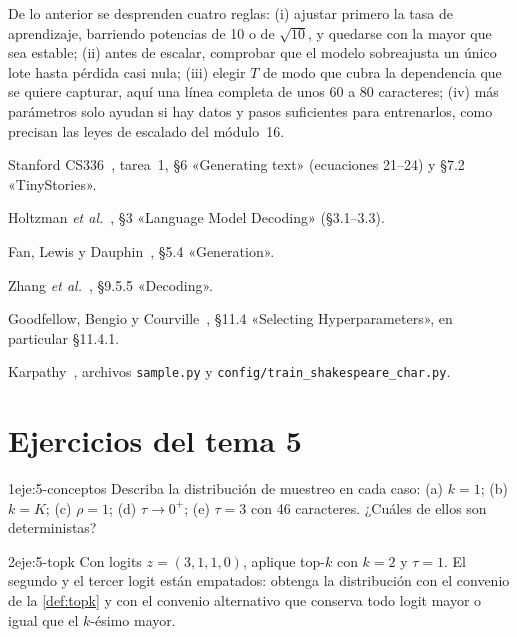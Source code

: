 \begin{observacion}\label{obs:reglas}
De lo anterior se desprenden cuatro reglas: (i) ajustar primero la tasa de aprendizaje, barriendo potencias de 10 o de $\sqrt{10}$, y quedarse con la mayor que sea estable; (ii) antes de escalar, comprobar que el modelo sobreajusta un único lote hasta pérdida casi nula; (iii) elegir $T$ de modo que cubra la dependencia que se quiere capturar, aquí una línea completa de unos 60 a 80 caracteres; (iv) más parámetros solo ayudan si hay datos y pasos suficientes para entrenarlos, como precisan las leyes de escalado del módulo~16.
\end{observacion}

\begin{lecturas}
\item Stanford CS336~\cite{cs336}, tarea~1, §6 «Generating text» (ecuaciones 21--24) y §7.2 «TinyStories».
\item Holtzman \emph{et al.}~\cite{holtzman}, §3 «Language Model Decoding» (§3.1--3.3).
\item Fan, Lewis y Dauphin~\cite{fan}, §5.4 «Generation».
\item Zhang \emph{et al.}~\cite{d2l}, §9.5.5 «Decoding».
\item Goodfellow, Bengio y Courville~\cite{gbc}, §11.4 «Selecting Hyperparameters», en particular §11.4.1.
\item Karpathy~\cite{nanogpt}, archivos \texttt{sample.py} y \texttt{config/train\_shakespeare\_char.py}.
\end{lecturas}

\section*{Ejercicios del tema 5}

\begin{ejercicio}{1}{eje:5-conceptos}
Describa la distribución de muestreo en cada caso: (a) $k=1$; (b) $k=K$; (c) $\rho=1$; (d) $\tau\to 0^{+}$; (e) $\tau=3$ con 46 caracteres. ¿Cuáles de ellos son deterministas?
\end{ejercicio}

\begin{ejercicio}{2}{eje:5-topk}
Con logits $z=(3,1,1,0)$, aplique top-$k$ con $k=2$ y $\tau=1$. El segundo y el tercer logit están empatados: obtenga la distribución con el convenio de la \cref{def:topk} y con el convenio alternativo que conserva todo logit mayor o igual que el $k$-ésimo mayor.
\end{ejercicio}

